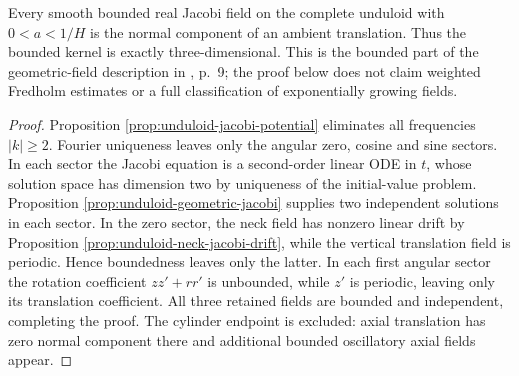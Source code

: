 \begin{theorem}\label{thm:unduloid-bounded-jacobi}
Every smooth bounded real Jacobi field on the complete unduloid with $0<a<1/H$ is the normal component of an ambient translation. Thus the bounded kernel is exactly three-dimensional. This is the bounded part of the geometric-field description in \cite{Maz02}, p.~9; the proof below does not claim weighted Fredholm estimates or a full classification of exponentially growing fields.
\end{theorem}
\begin{proof}
Proposition \ref{prop:unduloid-jacobi-potential} eliminates all frequencies $|k|\ge2$. Fourier uniqueness leaves only the angular zero, cosine and sine sectors. In each sector the Jacobi equation is a second-order linear ODE in $t$, whose solution space has dimension two by uniqueness of the initial-value problem. Proposition \ref{prop:unduloid-geometric-jacobi} supplies two independent solutions in each sector. In the zero sector, the neck field has nonzero linear drift by Proposition \ref{prop:unduloid-neck-jacobi-drift}, while the vertical translation field is periodic. Hence boundedness leaves only the latter. In each first angular sector the rotation coefficient $zz'+rr'$ is unbounded, while $z'$ is periodic, leaving only its translation coefficient. All three retained fields are bounded and independent, completing the proof. The cylinder endpoint is excluded: axial translation has zero normal component there and additional bounded oscillatory axial fields appear.
\end{proof}

